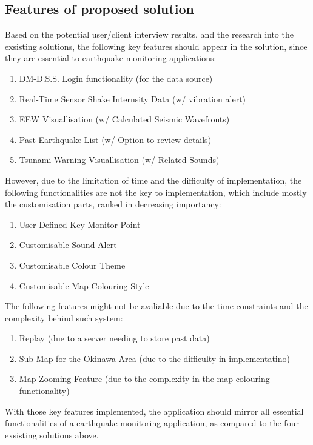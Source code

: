 \documentclass{article}
\begin{document}
\subsection{Features of proposed solution}

Based on the potential user/client interview results, and the research into the exsisting solutions, the following key features should appear in the solution, since they are essential to earthquake monitoring applications:
\begin{enumerate}
    \item DM-D.S.S. Login functionality (for the data source)
    \item Real-Time Sensor Shake Internsity Data (w/ vibration alert)
    \item EEW Visuallisation (w/ Calculated Seismic Wavefronts)
    \item Past Earthquake List (w/ Option to review details)
    \item Tsunami Warning Visuallisation (w/ Related Sounds)
\end{enumerate}

However, due to the limitation of time and the difficulty of implementation, the following functionalities are not the key to implementation, which include mostly the customisation parts, ranked in decreasing importancy:
\begin{enumerate}
    \item User-Defined Key Monitor Point
    \item Customisable Sound Alert
    \item Customisable Colour Theme
    \item Customisable Map Colouring Style
\end{enumerate}

The following features might not be avaliable due to the time constraints and the complexity behind such system:
\begin{enumerate}
    \item Replay (due to a server needing to store past data)
    \item Sub-Map for the Okinawa Area (due to the difficulty in implementatino)
    \item Map Zooming Feature (due to the complexity in the map colouring functionality)
\end{enumerate}

With those key features implemented, the application should mirror all essential functionalities of a earthquake monitoring application, as compared to the four exsisting solutions above.
\end{document}

